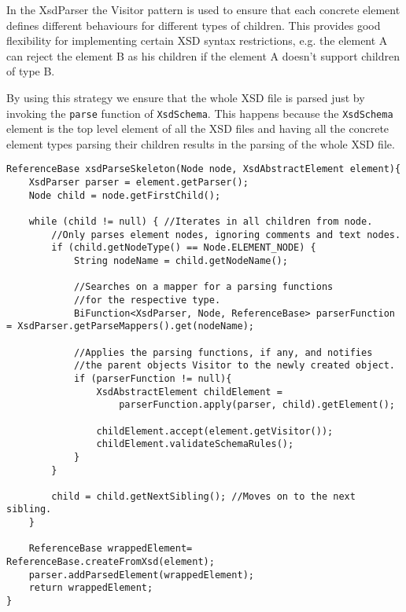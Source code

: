 \noindent
In the XsdParser the Visitor pattern is used to ensure that each concrete element defines different behaviours for different types of children. This provides good flexibility for implementing certain \ac{XSD} syntax restrictions, e.g. the element A can reject the element B as his children if the element A doesn't support children of type B.

\noindent
By using this strategy we ensure that the whole \ac{XSD} file is parsed just by invoking the \texttt{parse} function of \texttt{XsdSchema}. This happens because the \texttt{XsdSchema} element is the top level element of all the \ac{XSD} files and having all the concrete element types parsing their children results in the parsing of the whole \ac{XSD} file.

\bigskip


\begin{minipage}{\linewidth}
\begin{lstlisting}[caption={XsdParseSkeleton Parsing Children From a Node},captionpos=b,label={lst:skeletonfunction}]
ReferenceBase xsdParseSkeleton(Node node, XsdAbstractElement element){
    XsdParser parser = element.getParser();
    Node child = node.getFirstChild();

    while (child != null) { //Iterates in all children from node.
        //Only parses element nodes, ignoring comments and text nodes.
        if (child.getNodeType() == Node.ELEMENT_NODE) { 
            String nodeName = child.getNodeName();

            //Searches on a mapper for a parsing functions 
            //for the respective type.
            BiFunction<XsdParser, Node, ReferenceBase> parserFunction = XsdParser.getParseMappers().get(nodeName);

            //Applies the parsing functions, if any, and notifies 
            //the parent objects Visitor to the newly created object.
            if (parserFunction != null){
                XsdAbstractElement childElement =
                	parserFunction.apply(parser, child).getElement();
                
                childElement.accept(element.getVisitor());
                childElement.validateSchemaRules();
            }
        }

        child = child.getNextSibling(); //Moves on to the next sibling.
    }

    ReferenceBase wrappedElement= ReferenceBase.createFromXsd(element);
    parser.addParsedElement(wrappedElement);
    return wrappedElement;
}
\end{lstlisting}
\end{minipage}

